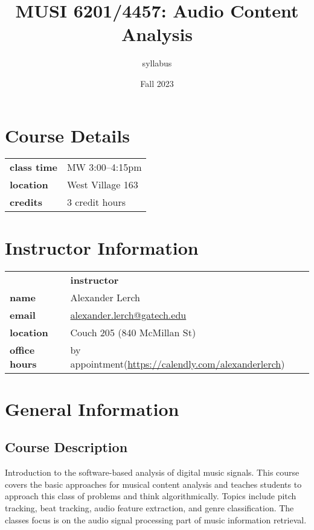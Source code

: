 \documentclass[letterpaper,oneside,10pt]{scrartcl}
\begin{document}
\title{MUSI 6201/4457: Audio Content Analysis}
\author{syllabus }
\date{Fall 2023} %
\maketitle

\pagestyle{plain} %

\section*{Course Details}
    \begin{tabular}{ll}
        \textbf{class time} & MW 3:00--4:15pm \\
        \textbf{location} & West Village 163\\
        \textbf{credits} & 3 credit hours
    \end{tabular}
\section*{Instructor Information}
    \begin{tabular}{lp{70mm}l}
        \textbf{} & \textbf{instructor} & \\%
        \textbf{name} & Alexander Lerch & \\%
        \textbf{email} & \url{alexander.lerch@gatech.edu} & \\%
        \textbf{location} & Couch 205 (840 McMillan St) & \\
        \textbf{office hours} & {by appointment\newline (\url{https://calendly.com/alexanderlerch})} & \\
    \end{tabular}
        
         
\section{General Information}        
    \subsection{Course Description}
        Introduction to the software-based analysis of digital music signals. This course covers the basic approaches for musical content analysis and teaches students to approach this class of problems and think algorithmically. Topics include pitch tracking, beat tracking, audio feature extraction, and genre classification. The classes focus is on the audio signal processing part of music information retrieval.
        
\end{document}
